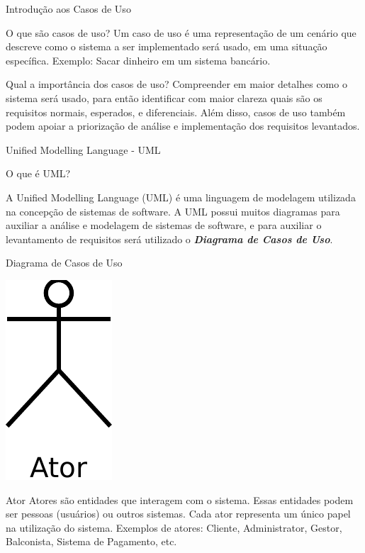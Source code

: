 \documentclass[xcolor=x11names,compress]{beamer}
\begin{document}
\begin{frame}{Introdução aos Casos de Uso}

\begin{alertblock}{O que são casos de uso?}
Um caso de uso é uma representação de um cenário que descreve como o sistema a ser implementado será usado, em uma situação específica. Exemplo: Sacar dinheiro em um sistema bancário.
\end{alertblock}

\pause

\begin{alertblock}{Qual a importância dos casos de uso?}
Compreender em maior detalhes como o sistema será usado, para então identificar com maior clareza quais são os requisitos normais, esperados, e diferenciais. Além disso, casos de uso também podem apoiar a priorização de análise e implementação dos requisitos levantados.
\end{alertblock}

\end{frame}

\begin{frame}{Unified Modelling Language - UML}

\begin{alertblock}{O que é UML?}

A Unified Modelling Language (UML) é uma linguagem de modelagem utilizada na concepção de sistemas de software. A UML possui muitos diagramas para auxiliar a análise e modelagem de sistemas de software, e para auxiliar o levantamento de requisitos será utilizado o \textit{\textbf{Diagrama de Casos de Uso}}.
\end{alertblock}

\end{frame}

\begin{frame}{Diagrama de Casos de Uso}

\centering \includegraphics[keepaspectratio,width=.1\textwidth]{Ator}

\begin{alertblock}{Ator}
Atores são entidades que interagem com o sistema. Essas entidades podem ser pessoas (usuários) ou outros sistemas. Cada ator representa um único papel na utilização do sistema. Exemplos de atores: Cliente, Administrator, Gestor, Balconista, Sistema de Pagamento, etc.
\end{alertblock}

\end{frame}
\end{document}
